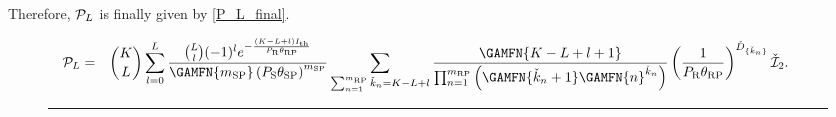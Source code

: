 \documentclass[10pt,journal]{IEEEtran}
\begin{document}
Therefore, $\mathcal{P}_L$ is finally given by \eqref{P_L_final}.
\begin{figure*}
\centering
\begin{eqnarray}
\!\!\!\!\!\!\!\!\!\!\PL
&=&
{K \choose L} \sum_{l=0}^L  \frac{{L \choose l}(-1)^l e^{-\frac{(K-L+l)\Ith}{\PR\thetarp}}}{\GAMFN{\msp}\left(\PS\thetasp\right)^\msp}
\sum_{\sum_{n=1}^{\mrp} \check{k}_{n} = K-L+l} \frac{\GAMFN{K-L+l+1}}{\prod_{n=1}^{\mrp}\left(\GAMFN{\check{k}_n+1}\GAMFN{n}^{\check{k}_n}\right)} \left(\frac{1}{\PR\thetarp}\right)^{\check{D}_{\{\check{k}_n\}}} \mathcal{\check{I}}_2.%
\label{P_L_final}
\end{eqnarray}
\hrule
\end{figure*}
\end{document}
